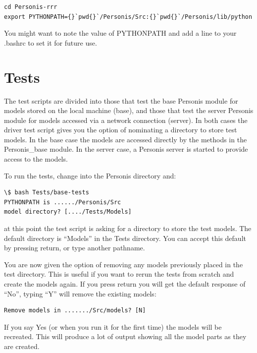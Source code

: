 \documentclass[a4paper,10pt,english]{sphinxmanual}
\begin{document}
\begin{Verbatim}[commandchars=\\\{\}]
cd Personis-rrr
export PYTHONPATH={}`pwd{}`/Personis/Src:{}`pwd{}`/Personis/lib/python
\end{Verbatim}

You might want to note the value of PYTHONPATH and add a line to
your .bashrc to set it for future use.


\chapter{Tests}
\label{Tests:tests}\label{Tests::doc}
The test scripts are divided into those that test the base Personis
module for models stored on the local machine (base), and those that
test the server Personis module for models accessed via a network
connection (server). In both cases the driver test script gives you the
option of nominating a directory to store test models. In the base case
the models are accessed directly by the methods in the Personis\_base
module. In the server case, a Personis server is started to provide
access to the models.

To run the tests, change into the Personis directory and:

\begin{Verbatim}[commandchars=\\\{\}]
\$ bash Tests/base-tests
PYTHONPATH is ....../Personis/Src
model directory? [..../Tests/Models]
\end{Verbatim}

at this point the test script is asking for a directory to store the test models. The default directory
is ``Models'' in the Tests directory. You can accept this default by pressing return, or type another pathname.

You are now given the option of removing any models previously placed in the test directory. This is useful if
you want to rerun the tests from scratch and create the models again. If you press return you will get
the default response of ``No'', typing ``Y'' will remove the existing models:

\begin{Verbatim}[commandchars=\\\{\}]
Remove models in ......./Src/models? [N]
\end{Verbatim}

If you say Yes (or when you run it for the first time) the models will be recreated.
This will produce a lot of output showing all the model parts as they are created.
\end{document}
